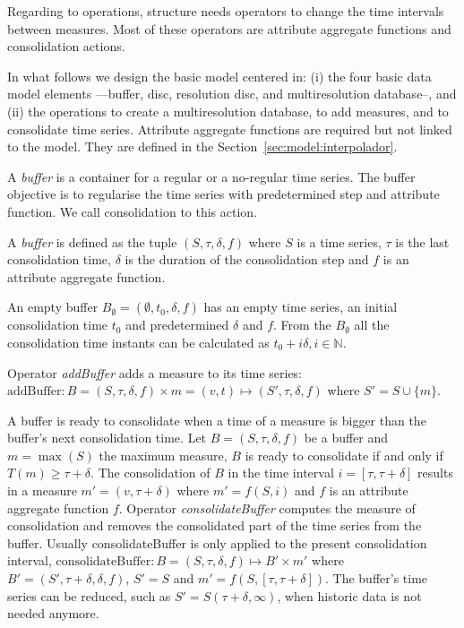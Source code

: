 Regarding to operations,  structure needs operators to
change the time intervals between measures. Most of these operators
are attribute aggregate functions and consolidation actions.

In what follows we design the basic  model centered in:
(i) the four basic data model elements ---buffer, disc, resolution
disc, and multiresolution database--, and (ii) the operations to
create a multiresolution database, to add measures, and to consolidate
time series. Attribute aggregate functions are required but not linked
to the model. They are defined in the
Section~\ref{sec:model:interpolador}.

A \emph{buffer} is a container for a regular or a no-regular time
series. The buffer objective is to regularise the time series with
predetermined step and attribute function. We call consolidation to
this action.
\begin{definition}[Buffer]
  A \emph{buffer} is defined as the tuple $(S,\tau,\delta,f)$ where
  $S$ is a time series, $\tau$ is the last consolidation time,
  $\delta$ is the duration of the consolidation step and $f$ is an
  attribute aggregate function.

  An empty buffer $B_{\emptyset} = (\emptyset,t_0, \delta, f)$ has an
  empty time series, an initial consolidation time $t_0$ and
  predetermined $\delta$ and $f$. From the $B_{\emptyset}$ all the
  consolidation time instants can be calculated as $t_0+i\delta,
  i\in\mathbb{N}$.
\end{definition}

Operator \emph{addBuffer} adds a measure to its time series:
$\text{addBuffer}: B = (S,\tau,\delta,f) \times m = (v,t) \mapsto
(S',\tau,\delta,f)$ where $S' = S \cup \{m\} $.

A buffer is ready to consolidate when a time of a measure is bigger
than the buffer's next consolidation time.  Let $B=(S,\tau,\delta,f)$
be a buffer and $m=\max(S)$ the maximum measure, $B$ is ready to
consolidate if and only if $T(m) \geq \tau+\delta$.  The consolidation
of $B$ in the time interval $i=[\tau,\tau+\delta]$ results in a
measure $m'=(v,\tau+\delta)$ where $m'=f(S,i)$ and $f$ is an attribute
aggregate function $f$. Operator \emph{consolidateBuffer} computes the
measure of consolidation and removes the consolidated part of the time
series from the buffer. Usually consolidateBuffer is only applied to
the present consolidation interval, $\text{consolidateBuffer}:
B=(S,\tau,\delta,f) \mapsto B' \times m' $ where $ B'=
(S',\tau+\delta,\delta,f)$, $S' = S$ and $m' =
f(S,[\tau,\tau+\delta])$. The buffer's time series can be reduced,
such as $ S' = S(\tau+\delta,\infty)$, when historic data is not
needed anymore.

